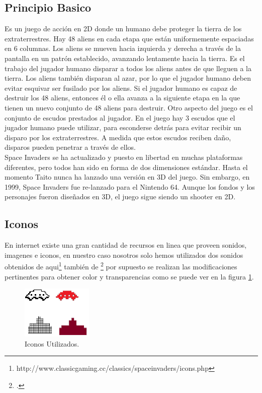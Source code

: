 \documentclass[a4paper]{article} %
\begin{document}
\subsection{Principio Basico}
Es un juego de acción en 2D donde un humano debe proteger la tierra de los extraterrestres. Hay 48 aliens en cada etapa que están uniformemente espaciadas en 6 columnas. Los aliens se mueven hacia izquierda y derecha a través de la pantalla en un patrón establecido, avanzando lentamente hacia la tierra. Es el trabajo del jugador humano disparar a todos los aliens antes de que lleguen a la tierra. Los aliens también disparan al azar, por lo que el jugador humano deben evitar esquivar ser fusilado por los aliens. Si el jugador humano es capaz de destruir los 48 aliens, entonces él o ella avanza a la siguiente etapa en la que tienen un nuevo conjunto de 48 aliens para destruir. Otro aspecto del juego es el conjunto de escudos prestados al jugador. En el juego hay 3 escudos que el jugador humano puede utilizar, para  esconderse detrás para evitar recibir un disparo por los extraterrestres. A medida que estos escudos reciben daño, disparos pueden penetrar a través de ellos.\\

Space Invaders se ha actualizado y puesto en libertad en muchas plataformas diferentes, pero todos han sido en forma de dos dimensiones estándar. Hasta el momento Taito nunca ha lanzado una versión en 3D del juego. Sin embargo, en 1999, Space Invaders fue re-lanzado para el Nintendo 64. Aunque los fondos y los personajes fueron diseñados en 3D, el juego sigue siendo un shooter en 2D.

\subsection{Iconos}
En internet existe una gran cantidad de recursos en linea que proveen sonidos, imagenes e iconos, en nuestro caso nosotros solo hemos utilizados dos sonidos obtenidos de aqui\footnote{http://www.classicgaming.cc/classics/spaceinvaders/icons.php} también de \footcite{http://www.softicons.com/game-icons/classic-games-icons-by-thvg/space-invaders-5-icon, SoftIcons} por supuesto se realizan las modificaciones pertinentes para obtener color y transparencias como se puede ver en la figura \ref{fig:iconos}.

\begin{figure}
  \centering
    \includegraphics[scale=0.5]{images/iconos}
  \caption{Iconos Utilizados.}
  \label{fig:iconos}
\end{figure}
\end{document}
